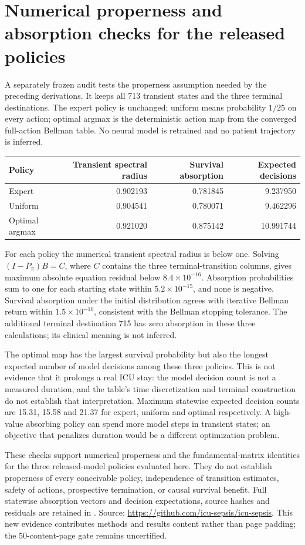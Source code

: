\section{Numerical properness and absorption checks for the released policies}
A separately frozen audit tests the properness assumption needed by the preceding derivations. It keeps all 713 transient states and the three terminal destinations. The expert policy is unchanged; uniform means probability $1/25$ on every action; optimal argmax is the deterministic action map from the converged full-action Bellman table. No neural model is retrained and no patient trajectory is inferred.

\begin{center}
\begin{tabular}{lrrr}\hline
Policy & Transient spectral radius & Survival absorption & Expected decisions\\\hline
Expert & 0.902193 & 0.781845 & 9.237950\\
Uniform & 0.904541 & 0.780071 & 9.462296\\
Optimal argmax & 0.921020 & 0.875142 & 10.991744\\\hline
\end{tabular}
\end{center}
For each policy the numerical transient spectral radius is below one. Solving $(I-P_\pi)B=C$, where $C$ contains the three terminal-transition columns, gives maximum absolute equation residual below $8.4\times10^{-16}$. Absorption probabilities sum to one for each starting state within $5.2\times10^{-15}$, and none is negative. Survival absorption under the initial distribution agrees with iterative Bellman return within $1.5\times10^{-10}$, consistent with the Bellman stopping tolerance. The additional terminal destination 715 has zero absorption in these three calculations; its clinical meaning is not inferred.

The optimal map has the largest survival probability but also the longest expected number of model decisions among these three policies. This is not evidence that it prolongs a real ICU stay: the model decision count is not a measured duration, and the table's time discretization and terminal construction do not establish that interpretation. Maximum statewise expected decision counts are 15.31, 15.58 and 21.37 for expert, uniform and optimal respectively. A high-value absorbing policy can spend more model steps in transient states; an objective that penalizes duration would be a different optimization problem.

These checks support numerical properness and the fundamental-matrix identities for the three released-model policies evaluated here. They do not establish properness of every conceivable policy, independence of transition estimates, safety of actions, prospective termination, or causal survival benefit. Full statewise absorption vectors and decision expectations, source hashes and residuals are retained in . Source: \url{https://github.com/icu-sepsis/icu-sepsis}. This new evidence contributes methods and results content rather than page padding; the 50-content-page gate remains uncertified.
